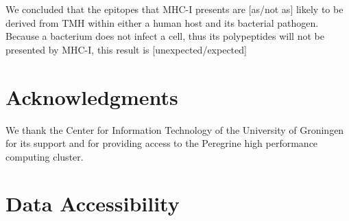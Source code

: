 \documentclass{article}
\newcommand{\frans}[1]{\textcolor{blue}{\textbf{[FB: #1]}}}
\newcommand{\richel}[1]{\textcolor{orange}{\textbf{[RB: #1]}}}
\begin{document}
We concluded that the
epitopes that MHC-I presents are [as/not as] likely 
to be derived from TMH within either a human host and its bacterial pathogen.
Because a bacterium does not infect a cell, thus its polypeptides
will not be presented by MHC-I, this result is [unexpected/expected]



\section{Acknowledgments}

We thank the Center for Information Technology of the University 
of Groningen for its support and for providing access to the Peregrine 
high performance computing cluster. 

\section{Data Accessibility}
\end{document}
